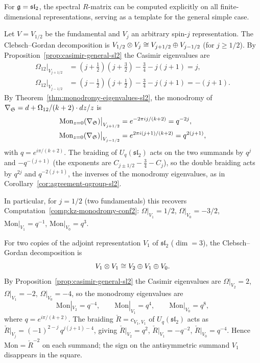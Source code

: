For $\mathfrak{g} = \mathfrak{sl}_2$, the spectral $R$-matrix can be computed explicitly on all finite-dimensional representations, serving as a template for the general simple case.

\begin{computation}
\label{comp:spectral-R-fund-general}
Let $V = V_{1/2}$ be the fundamental and $V_j$ an arbitrary spin-$j$ representation. The Clebsch--Gordan decomposition is $V_{1/2} \otimes V_j \cong V_{j+1/2} \oplus V_{j-1/2}$ (for $j \geq 1/2$). By Proposition~\ref{prop:casimir-general-sl2} the Casimir eigenvalues are
\begin{align*}
 \Omega_{12}\big|_{V_{j+1/2}} &= (j+\tfrac{1}{2})(j+\tfrac{3}{2}) - \tfrac{3}{4} - j(j+1) = j, \\
 \Omega_{12}\big|_{V_{j-1/2}} &= (j-\tfrac{1}{2})(j+\tfrac{1}{2}) - \tfrac{3}{4} - j(j+1) = -(j+1).
\end{align*}
By Theorem~\ref{thm:monodromy-eigenvalues-sl2}, the monodromy of $\nabla_{\mathfrak{S}} = d + \Omega_{12}/(k+2) \cdot dz/z$ is
\begin{align*}
 \mathrm{Mon}_{z=0}(\nabla_{\mathfrak{S}})\big|_{V_{j+1/2}} &= e^{-2\pi i j/(k+2)} = q^{-2j}, \\
 \mathrm{Mon}_{z=0}(\nabla_{\mathfrak{S}})\big|_{V_{j-1/2}} &= e^{2\pi i (j+1)/(k+2)} = q^{2(j+1)},
\end{align*}
with $q = e^{i\pi/(k+2)}$. The braiding of $U_q(\mathfrak{sl}_2)$ acts on the two summands by $q^{j}$ and $-q^{-(j+1)}$ (the exponents are $C_{j\pm 1/2} - \tfrac{3}{4} - C_j$), so the double braiding acts by $q^{2j}$ and $q^{-2(j+1)}$, the inverses of the monodromy eigenvalues, as in Corollary~\ref{cor:agreement-qgroup-sl2}.

In particular, for $j = 1/2$ (two fundamentals) this recovers Computation~\ref{comp:kz-monodromy-conf2}: $\Omega|_{V_1} = 1/2$, $\Omega|_{V_0} = -3/2$, $\mathrm{Mon}|_{V_1} = q^{-1}$, $\mathrm{Mon}|_{V_0} = q^{3}$.
\end{computation}

\begin{computation}
\label{comp:R-matrix-adjoint}
For two copies of the adjoint representation $V_1$ of $\mathfrak{sl}_2$ ($\dim = 3$), the Clebsch--Gordan decomposition is
\[
 V_1 \otimes V_1 \cong V_2 \oplus V_1 \oplus V_0.
\]
By Proposition~\ref{prop:casimir-general-sl2} the Casimir eigenvalues are $\Omega|_{V_2} = 2$, $\Omega|_{V_1} = -2$, $\Omega|_{V_0} = -4$, so the monodromy eigenvalues are
\[
 \mathrm{Mon}|_{V_2} = q^{-4}, \qquad \mathrm{Mon}|_{V_1} = q^{4}, \qquad \mathrm{Mon}|_{V_0} = q^{8},
\]
where $q = e^{i\pi/(k+2)}$.
The braiding $\check{R} = c_{V_1,V_1}$ of $U_q(\mathfrak{sl}_2)$ acts as $\check{R}|_{V_j} = (-1)^{2-j}\,q^{j(j+1)-4}$, giving $\check{R}|_{V_2} = q^2$, $\check{R}|_{V_1} = -q^{-2}$, $\check{R}|_{V_0} = q^{-4}$. Hence $\mathrm{Mon} = \check{R}^{-2}$ on each summand; the sign on the antisymmetric summand $V_1$ disappears in the square.
\end{computation}

